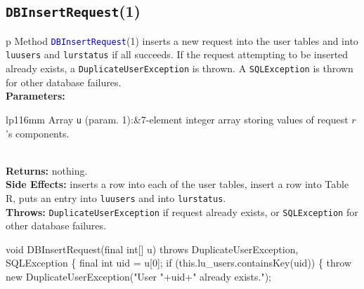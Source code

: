 \subsection{\texttt{DBInsertRequest}(1)}
\begin{tabular}{p{\textwidth}}
\toprule
{}
Method \textcolor{blue}{{\tt{}\protect{}DBInsertRequest}}(1) inserts a new request into the
user tables and into {\tt{}lu{}users} and {\tt{}lu{}rstatus} if all succeeds.  If the
request attempting to be inserted already exists, a {\tt{}DuplicateUserException}
is thrown. A {\tt{}SQLException} is thrown for other database failures.\\
\midrule
\textbf{Parameters:} \\
\begin{tabular}{lp{116mm}}
Array {\tt{}u} (param. 1):&7-element integer array storing values of
request $r$'s components.

\end{tabular}\\
\textbf{Returns:} nothing.\\
\textbf{Side Effects:} inserts a row into each of the user tables, insert a
row into Table R, puts an entry into {\tt{}lu{}users} and into {\tt{}lu{}rstatus}.\\
\textbf{Throws:} {\tt{}DuplicateUserException} if request already exists, or
{\tt{}SQLException} for other database failures.\\
\bottomrule
\end{tabular}
\nwenddocs{}\endmoddef{}
void DBInsertRequest(final int[] u)
throws DuplicateUserException, SQLException \{
  final int uid = u[0];
  if (this.lu_users.containsKey(uid)) \{
    throw new DuplicateUserException("User "+uid+" already exists.");

